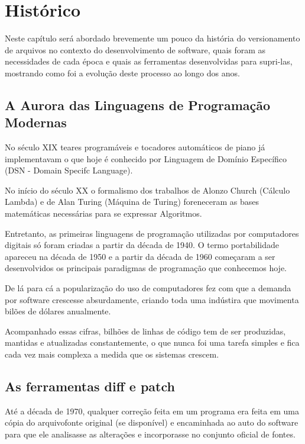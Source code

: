 \chapter{Histórico}

Neste capítulo será abordado brevemente um pouco da história do versionamento de arquivos
no contexto do desenvolvimento de software, quais foram as necessidades de cada época e quais
as ferramentas desenvolvidas para supri-las, mostrando como foi a evolução deste processo
ao longo dos anos.

\section{A Aurora das Linguagens de Programação Modernas}

No século XIX teares programáveis e tocadores automáticos de piano já implementavam o que
hoje é conhecido por Linguagem de Domínio Específico (DSN - Domain Specifc Language).

No início do século XX  o formalismo dos trabalhos de Alonzo Church (Cálculo Lambda) \cite{Church}e
de Alan Turing (Máquina de Turing) \cite{Turing} foreneceram as bases matemáticas necessárias para se
expressar Algoritmos.
 
Entretanto, as primeiras linguagens de programação utilizadas por computadores digitais
só foram criadas a partir da década de 1940. O termo portabilidade apareceu na década de
1950 e a partir da década de 1960 começaram a ser desenvolvidos os principais paradigmas
de programação que conhecemos hoje.

De lá para cá a popularização do uso de computadores fez com que a demanda por software
crescesse absurdamente, criando toda uma indústira que movimenta bilões de dólares anualmente.

Acompanhado essas cifras, bilhões de linhas de código tem de ser produzidas, mantidas e atualizadas constantemente, o que nunca foi uma tarefa simples e fica cada vez mais complexa a medida
que os sistemas crescem.

\section{As ferramentas diff e patch}

Até a década de 1970, qualquer correção feita em um programa era feita em
uma cópia do arquivofonte original (se disponível) e encaminhada ao auto
do software para que ele analisasse as alterações e incorporasse no
conjunto oficial de fontes.

